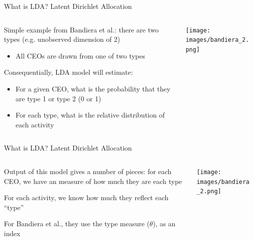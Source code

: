 \documentclass[notes,11pt, aspectratio=169]{beamer}
\newenvironment{wideitemize}{\itemize\addtolength{\itemsep}{10pt}}{\enditemize}
\begin{document}
  \begin{frame}{What is LDA? Latent Dirichlet Allocation}
    \begin{columns}[onlytextwidth, T] %
      \begin{column}{.5\textwidth}
        \begin{wideitemize}
        \item Simple example from Bandiera et al.: there are two types
          (e.g. unobserved dimension of 2)
          \begin{itemize}
          \item All CEOs are drawn from one of two types            
          \end{itemize}
        \item Consequentially, LDA model will estimate:
          \begin{itemize}
          \item For a given CEO, what is the probability that they are type 1 or type 2 (0 or 1)
          \item For each type, what is the relative distribution of each activity
          \end{itemize}
        \end{wideitemize}
      \end{column}%
      \hfill%
      \begin{column}{.5\textwidth}
        \texttt{[image: images/bandiera\_2.png]}
      \end{column}%
    \end{columns}
  \end{frame}

  \begin{frame}{What is LDA? Latent Dirichlet Allocation}
    \begin{columns}[onlytextwidth, T] %
      \begin{column}{.5\textwidth}
        \begin{wideitemize}
        \item Output of this model gives a number of pieces: for each
          CEO, we have an measure of how much they are each type
        \item For each activity, we know how much they reflect each
          ``type''
        \item For Bandiera et al., they use the type measure
          ($\theta$), as an index
        \end{wideitemize}
      \end{column}%
      \hfill%
      \begin{column}{.5\textwidth}
        \texttt{[image: images/bandiera\_2.png]}
      \end{column}%
    \end{columns}
  \end{frame}
\end{document}
